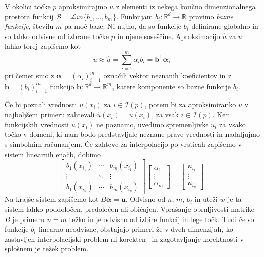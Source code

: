 \documentclass[12pt,a4paper,twoside]{article}
\theoremstyle{definition} %
\theoremstyle{plain} %
\numberwithin{equation}{section}
\newcommand{\R}{\mathbb R}
\newcommand{\I}{\mathcal{I}}
\newcommand{\B}{\mathcal{B}}
\newcommand{\T}{\mathsf{T}}
\renewcommand{\b}{\boldsymbol}
\newcommand{\Lin}{\mathcal{L}in}
\newcommand{\uh}{\hat{u}}
\begin{document}
V okolici točke $p$ aproksimirajmo $u$ z elementi iz nekega končno
dimenzionalnega prostora funkcij $\B = \Lin\{b_1, \dots, b_m\}$.
Funkcijam $b_i\colon \R^d \to \R$ pravimo \emph{bazne funkcije},
številu $m$ pa moč baze. Ni nujno, da so funkcije $b_i$ definirane
globalno in so lahko odvisne od izbrane točke $p$ in njene soseščine.
Aproksimacijo $\uh$ za $u$ lahko torej zapišemo kot
\[
  u \approx \uh = \sum_{i=1}^m \alpha_i b_i = \b{b}^\T \b{\alpha},
\]
pri čemer smo z $\b{\alpha} = (\alpha_i)_{i=1}^m$ označili vektor neznanih
koeficientov in z $\b{b} = (b_i)_{i=1}^m$ funkcijo $\b{b}\colon\R^d\to\R^m$, katere
komponente so bazne funkcije $b_i$.

Če bi poznali vrednosti $u(x_i)$ za $i \in \I(p)$, potem bi za aproksimiranko
$\uh$ v najboljšem primeru zahtevali  $\hat{u}(x_i) = u(x_i)$, za vsak $i \in \I(p)$.
Ker funkcijskih vrednosti $u(x_i)$ ne poznamo, uvedimo spremenljivke $u_i$ za vsako točko v domeni,
ki nam bodo predstavljale neznane prave vrednosti in nadaljujmo s simbolnim računanjem.
Če zahteve za interpolacijo po vrsticah zapišemo v sistem linearnih enačb, dobimo
\begin{equation}
\begin{bmatrix}
  b_1(x_{i_1}) & \cdots & b_m(x_{i_1}) \\
  \vdots & \ddots & \vdots   \\
  b_1(x_{i_n}) & \cdots & b_m(x_{i_n})
\end{bmatrix}
\begin{bmatrix}
  \alpha_1 \\ \vdots \\ \alpha_m
\end{bmatrix}
=
\begin{bmatrix}
  u_{i_1} \\ \vdots \\ u_{i_n}
\end{bmatrix}.
  \label{eq:shape-system}
\end{equation}
Na krajše sistem zapišemo kot $B\b{\alpha} = \b{\tilde{u}}$. Odvisno od $n$, $m$, $b_i$ in uteži $w$
je ta sistem lahko poddoločen, predoločen ali običajen. Vprašanje obrnljivosti matrike $B$ je
primeru $n=m$ težko in je odvisno od izbire funkcij in lege točk. Tudi če so funkcije $b_i$ linearno
neodvisne, obstajajo primeri že v dveh dimenzijah, ko zastavljen interpolacijski problem ni
korekten~\cite[str.\ 79, izrek 2.2]{kozak2008numericna} in zagotavljanje korektnosti v splošnem je
težek problem.
\end{document}
